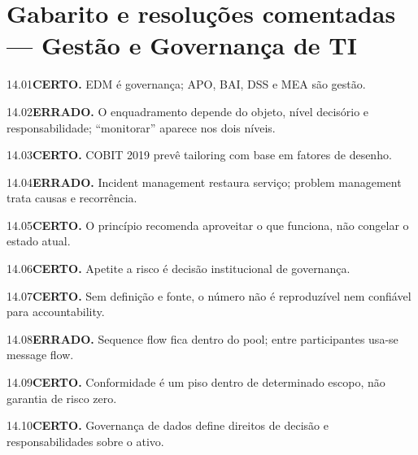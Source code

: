 \section{Gabarito e resoluções comentadas — Gestão e Governança de TI}

\begin{solucao}{14.01}\textbf{CERTO.} EDM é governança; APO, BAI, DSS e MEA são gestão.\end{solucao}
\begin{solucao}{14.02}\textbf{ERRADO.} O enquadramento depende do objeto, nível decisório e responsabilidade; ``monitorar'' aparece nos dois níveis.\end{solucao}
\begin{solucao}{14.03}\textbf{CERTO.} COBIT 2019 prevê tailoring com base em fatores de desenho.\end{solucao}
\begin{solucao}{14.04}\textbf{ERRADO.} Incident management restaura serviço; problem management trata causas e recorrência.\end{solucao}
\begin{solucao}{14.05}\textbf{CERTO.} O princípio recomenda aproveitar o que funciona, não congelar o estado atual.\end{solucao}
\begin{solucao}{14.06}\textbf{CERTO.} Apetite a risco é decisão institucional de governança.\end{solucao}
\begin{solucao}{14.07}\textbf{CERTO.} Sem definição e fonte, o número não é reproduzível nem confiável para accountability.\end{solucao}
\begin{solucao}{14.08}\textbf{ERRADO.} Sequence flow fica dentro do pool; entre participantes usa-se message flow.\end{solucao}
\begin{solucao}{14.09}\textbf{CERTO.} Conformidade é um piso dentro de determinado escopo, não garantia de risco zero.\end{solucao}
\begin{solucao}{14.10}\textbf{CERTO.} Governança de dados define direitos de decisão e responsabilidades sobre o ativo.\end{solucao}


